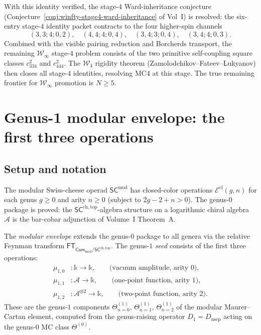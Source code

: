\documentclass[11pt]{article}
\newcommand{\cA}{\mathcal{A}}
\newcommand{\cW}{\mathcal{W}}
\newcommand{\Com}{\mathsf{Com}}
\newcommand{\SCchtop}{\mathsf{SC}^{\mathrm{ch,top}}}
\providecommand{\SCmod}{\mathsf{SC}^{\mathrm{mod}}}
\providecommand{\cE}{\mathcal{E}}
\providecommand{\FT}{\mathsf{FT}}
\begin{document}
\begin{remark}
With this identity verified, the stage-$4$ Ward-inheritance conjecture
(Conjecture~\ref*{conj:winfty-stage4-ward-inheritance} of Vol~I) is
resolved: the six-entry stage-$4$ identity packet contracts to the four
higher-spin channels
\[
(3,3;4;0,2),\quad
(4,4;4;0,4),\quad
(3,4;3;0,4),\quad
(3,4;4;0,3).
\]
Combined with the visible pairing reduction and Borcherds transport, the
remaining $\cW_\infty$ stage-$4$ problem consists of the two primitive
self-coupling square classes $c_{334}^2$ and $c_{444}^2$.  The $\cW_4$
rigidity theorem (Zamolodchikov--Fateev--Lukyanov) then closes all
stage-$4$ identities, resolving MC4 at this stage.  The true remaining
frontier for $\cW_\infty$ promotion is $N\ge 5$.
\end{remark}



\section{Genus-1 modular envelope: the first three operations}
\label{sec:genus1-modular-envelope}

\subsection{Setup and notation}

The modular Swiss-cheese operad $\SCmod$ has closed-color operations
$\cE^{\mathrm{cl}}(g,n)$ for each genus $g \geq 0$ and arity $n \geq 0$
(subject to $2g - 2 + n > 0$).  The genus-$0$ package is proved: the
$\SCchtop$-algebra structure on a logarithmic chiral algebra $\cA$ is
the bar-cobar adjunction of Volume~I Theorem~A.

The \emph{modular envelope} extends the genus-$0$ package to all genera
via the relative Feynman transform $\FT_{\Com_{\mathrm{mod}}/\SCchtop}$.
The genus-$1$ \emph{seed} consists of the first three operations:
\begin{align*}
\mu_{1,0} &\colon \mathbb{k} \longrightarrow \mathbb{k},
\qquad\text{(vacuum amplitude, arity $0$)},\\
\mu_{1,1} &\colon \cA \longrightarrow \mathbb{k},
\qquad\text{(one-point function, arity $1$)},\\
\mu_{1,2} &\colon \cA^{\otimes 2} \longrightarrow \mathbb{k},
\qquad\text{(two-point function, arity $2$)}.
\end{align*}
These are the genus-$1$ components $\Theta^{(1)}_{n=0}$,
$\Theta^{(1)}_{n=1}$, $\Theta^{(1)}_{n=2}$ of the modular
Maurer--Cartan element, computed from the genus-raising operator
$D_1 = D_{\mathrm{nsep}}$ acting on the genus-$0$ MC class
$\Theta^{(0)}$.
\end{document}
